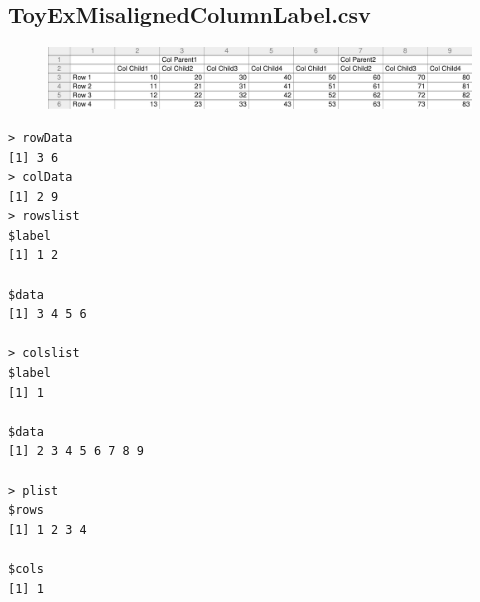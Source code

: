 \documentclass[a4paper]{article}
\begin{document}
\subsection{ToyExMisalignedColumnLabel.csv}
\label{sec:TCRO_ToyExMisalignedColumnLabel.csv}
\begin{figure}[!h]
\centering
\includegraphics[width=\textwidth]{./TestCase/ToyExMisalignedColumnLabel.pdf}
\end{figure}
\begin{verbatim}
> rowData 
[1] 3 6
> colData 
[1] 2 9
> rowslist 
$label
[1] 1 2

$data
[1] 3 4 5 6

> colslist 
$label
[1] 1

$data
[1] 2 3 4 5 6 7 8 9

> plist 
$rows
[1] 1 2 3 4

$cols
[1] 1


\end{verbatim}
\end{document}
